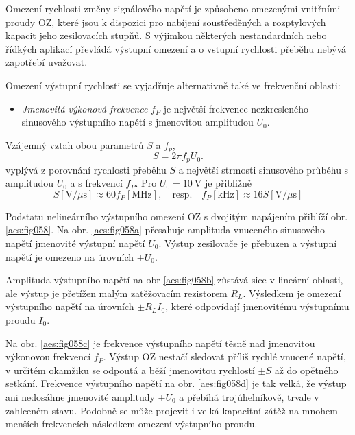       Omezení rychlosti změny signálového napětí je způsobeno omezenými vnitřními proudy OZ, které
      jsou k dispozici pro nabíjení soustředěných a rozptylových kapacit jeho zesilovacích stupňů.
      S výjimkou některých nestandardních nebo řídkých aplikací převládá výstupní omezení a o
      vstupní rychlosti přeběhu nebývá zapotřebí uvažovat.

      Omezení výstupní rychlosti se vyjadřuje alternativně také ve frekvenční oblasti:
      \begin{itemize}[noitemsep]
        \item \emph{Jmenovitá výkonová frekvence} \(f_P\) je největší frekvence nezkresleného
              sinusového výstupního napětí s jmenovitou amplitudou \(U_0\).        
      \end{itemize}
      Vzájemný vztah obou parametrů \(S\) a \(f_p\),
      \begin{equation}\label{aes:eq038}
        S = 2\pi f_p U_0.
      \end{equation}
      vyplývá z porovnání rychlosti přeběhu \(S\) a největší strmosti sinusového průběhu s
      amplitudou \(U_0\) a s frekvencí \(f_P\). Pro \(U_0 = \SI{10}{\V}\) je přibližně
      \begin{equation*}
        S [\si{\V/\mu\s}] \approx 60f_P [\si{\mega\hertz}], \quad\text{resp.}\quad 
        f_P [\si{\kilo\hertz}] \approx 16 S [\si{\V/\mu\s}]
      \end{equation*}

      Podstatu nelineárního výstupního omezení OZ s dvojitým napájením přiblíží obr.
      \ref{aes:fig058}. Na obr. \ref{aes:fig058a} přesahuje amplituda vnuceného sinusového napětí
      jmenovité výstupní napětí \(U_0\). Výstup zesilovače je přebuzen a výstupní napětí je omezeno
      na úrovních \(\pm U_0\).

      Amplituda výstupního napětí na obr \ref{aes:fig058b} zůstává sice v lineární oblasti, ale
      výstup je přetížen malým zatěžovacím rezistorem \(R_L\). Výsledkem je omezení výstupního
      napětí na úrovních \(\pm R_LI_0\), které odpovídají jmenovitému výstupnímu proudu \(I_0\).

      Na obr. \ref{aes:fig058c} je frekvence výstupního napětí těsně nad jmenovitou výkonovou
      frekvencí \(f_P\). Výstup OZ nestačí sledovat příliš rychlé vnucené napětí, v určitém okamžiku
      se odpoutá a běží jmenovitou rychlostí \(\pm S\) až do opětného setkání. Frekvence výstupního
      napětí na obr. \ref{aes:fig058d} je tak velká, že výstup ani nedosáhne jmenovité amplitudy
      \(\pm U_0\) a přebíhá trojúhelníkově, trvale v zahlceném stavu. Podobně se může projevit i
      velká kapacitní zátěž na mnohem menších frekvencích následkem omezení výstupního proudu.

